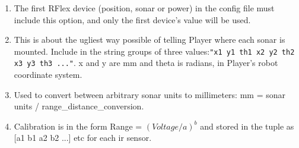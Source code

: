 \begin{enumerate}
\begin{itemize}
  \end{itemize}

\item The first RFlex device (position, sonar or power) in the config file must include this option, and only the first device's value will be used.
\item This is about the ugliest way possible of telling Player where each sonar is mounted.  Include in the string groups of three values:{\tt "x1 y1 th1 x2 y2 th2 x3 y3 th3 ..."}.  x and y are mm and theta is radians, in Player's robot coordinate system.
\item Used to convert between arbitrary sonar units to millimeters: mm = sonar units / range\_distance\_conversion.
\item Calibration is in the form Range = $(Voltage/a)^b$ and stored in the tuple as [a1 b1 a2 b2 ...] etc for each ir sensor.
\end{enumerate}

